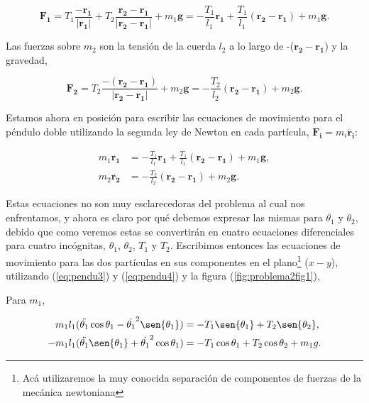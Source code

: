 \documentclass[a4paper,10pt]{article}
\numberwithin{equation}{section}
\begin{document}
\begin{equation}
 \mathbf{F_1} = T_1 \frac{-\mathbf{r_1}}{|\mathbf{r_1}|} + T_2 \frac{\mathbf{r_2} - \mathbf{r_1}}{|\mathbf{r_2} -\mathbf{r_1}|}
	      + m_1 \mathbf{g} = - \frac{T_1}{l_1} \mathbf{r_1} + \frac{T_1}{l_1} (\mathbf{r_2} - \mathbf{r_1}) + m_1 \mathbf{g}.
\end{equation}

Las fuerzas sobre $m_2$ son la tensión de la cuerda $l_2$ a lo largo de -($\mathbf{r_2} - \mathbf{r_1}$)
y la gravedad,

\begin{equation}
 \mathbf{F_2} = T_2 \frac{-(\mathbf{r_2} - \mathbf{r_1})}{|\mathbf{r_2} -\mathbf{r_1}|}
	      + m_2 \mathbf{g} = - \frac{T_2}{l_2} (\mathbf{r_2} -\mathbf{r_1}) + m_2 \mathbf{g}.
\end{equation}

Estamos ahora en posición para escribir las ecuaciones de movimiento para el péndulo 
doble utilizando la segunda ley de Newton en cada partícula, $\mathbf{F_i} = m_i \ddot{\mathbf{r_i}}$:

\begin{align}
 m_1 \ddot{\mathbf{r_1}} &= - \frac{T_1}{l_1} \mathbf{r_1} + \frac{T_1}{l_1} (\mathbf{r_2} - \mathbf{r_1}) + m_1 \mathbf{g}, \\
 m_2 \ddot{\mathbf{r_2}} &= - \frac{T_2}{l_2} (\mathbf{r_2} -\mathbf{r_1}) + m_2 \mathbf{g}.
\end{align}

Estas ecuaciones no son muy esclarecedoras del problema al cual nos enfrentamos, y ahora 
es claro por qué debemos expresar las mismas para $\theta_1$ y $\theta_2$, debido que como 
veremos estas se convertirán en cuatro ecuaciones diferenciales para cuatro incógnitas, 
$\theta_1$, $\theta_2$, $T_1$ y $T_2$. Escribimos entonces las ecuaciones de movimiento 
para las dos partículas en sus componentes en el plano\footnote{Acá utilizaremos la muy conocida separación
de componentes de fuerzas de la mecánica newtoniana} ($x-y$), utilizando (\ref{eq:pendu3}) y (\ref{eq:pendu4}) y 
la figura (\ref{fig:problema2fig1}),

Para $m_1$,

\begin{align}
 m_1 l_1 (\ddot{\theta_1}\cos{\theta_1} - \dot{\theta_1}^2\sen{\theta_1}) &= - T_1 \sen{\theta_1} + T_2 \sen{\theta_2}, \\
 -m_1 l_1 (\ddot{\theta_1}\sen{\theta_1} + \dot{\theta_1}^2\cos{\theta_1}) &= - T_1 \cos{\theta_1} + T_2 \cos{\theta_2} + m_1 g.
\end{align}
\end{document}
